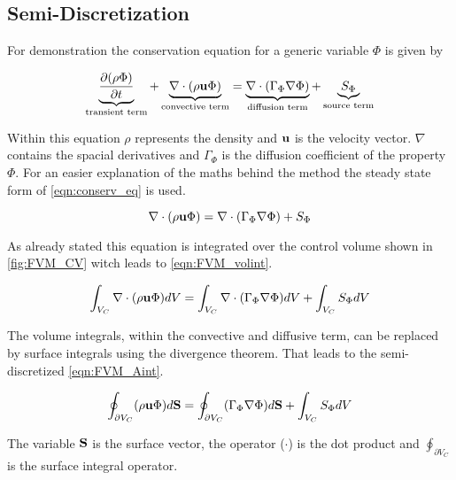 \documentclass[../thesis.tex]{subfiles}
\begin{document}
\subsection{Semi-Discretization}

For demonstration the conservation equation for a generic variable $ \Phi $ is given by

\begin{equation}
	\label{eqn:conserv_eq}
	\underbrace{\dfrac{\partial(\rho \Phi)}{\partial t}}_{\text{transient term}} + \underbrace{\nabla \cdot (\rho \bold{u} \Phi)}_{\text{convective term}} = \underbrace{\nabla \cdot (\Gamma_\Phi \nabla \Phi)}_{\text{diffusion term}} + \underbrace{S_\Phi}_{\text{source term}}
\end{equation}

Within this equation $ \rho $ represents the density and $ \bold{u} $ is the velocity vector. $ \nabla $ contains the spacial derivatives and $ \Gamma_\Phi $ is the diffusion coefficient of the property $ \Phi $.
For an easier explanation of the maths behind the method the steady state form of \autoref{eqn:conserv_eq} is used.

\begin{equation}
	\nabla \cdot (\rho \bold{u} \Phi) = \nabla \cdot (\Gamma_\Phi \nabla \Phi) + S_\Phi
\end{equation}

As already stated this equation is integrated over the control volume shown in \autoref{fig:FVM_CV} witch leads to \autoref{eqn:FVM_volint}.

\begin{equation}
	\label{eqn:FVM_volint}
	\int_{V_C} \nabla \cdot (\rho \bold{u} \Phi) dV = \int_{V_C} \nabla \cdot (\Gamma_\Phi \nabla \Phi) dV + \int_{V_C} S_\Phi dV
\end{equation}

The volume integrals, within the convective and diffusive term, can be replaced by surface integrals using the divergence theorem. That leads to the semi-discretized \autoref{eqn:FVM_Aint}.

\begin{equation}
	\label{eqn:FVM_Aint}
	\oint_{\partial V_C} (\rho \bold{u} \Phi) d\bold{S} = \oint_{\partial V_C} (\Gamma_\Phi \nabla \Phi) d\bold{S} + \int_{V_C} S_\Phi dV
\end{equation}

The variable $ \bold{S}$ is the surface vector, the operator ($\cdot$) is the dot product and $ \oint_{\partial V_C}$ is the surface integral operator.
\end{document}
